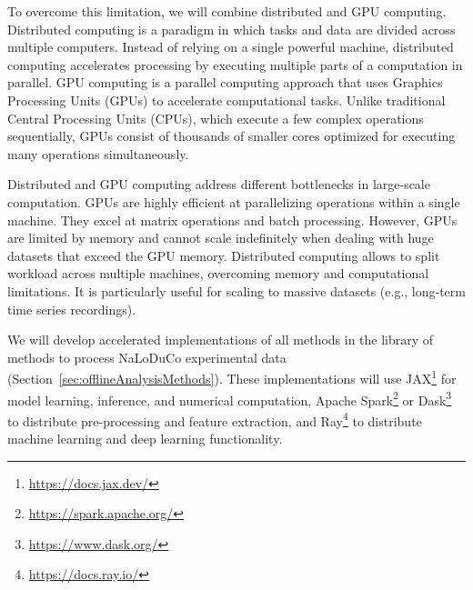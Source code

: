 \documentclass[12pt]{article}
\begin{document}
To overcome this limitation, we will combine distributed and GPU computing.
%
Distributed computing is a paradigm
in which tasks and data are divided across multiple computers. Instead of
relying on a single powerful machine, distributed computing accelerates
processing by executing multiple parts of a computation in parallel.
%
GPU computing is a parallel computing approach that uses Graphics Processing
Units (GPUs) to accelerate computational tasks. Unlike traditional Central
Processing Units (CPUs), which execute a few complex operations sequentially,
GPUs consist of thousands of smaller cores optimized for executing many
operations simultaneously.

Distributed and GPU computing address different bottlenecks in large-scale
computation. GPUs are highly efficient at parallelizing operations within a
single machine. They excel at matrix operations and batch processing. However,
GPUs are limited by memory and cannot scale indefinitely when dealing with huge
datasets that exceed the GPU memory.
%
Distributed computing allows to split workload across multiple machines,
overcoming memory and computational limitations. It is particularly useful for
scaling to massive datasets (e.g., long-term time series recordings).

We will develop accelerated implementations of all methods in the library of
methods to process NaLoDuCo experimental data
(Section~\ref{sec:offlineAnalysisMethods}). These implementations will use
JAX\footnote{\url{https://docs.jax.dev/}} for model learning, inference, and numerical computation, Apache
Spark\footnote{\url{https://spark.apache.org/}} or
Dask\footnote{\url{https://www.dask.org/}} to distribute pre-processing and
feature extraction, and Ray\footnote{\url{https://docs.ray.io/}} to distribute
machine learning and deep learning functionality.
\end{document}
